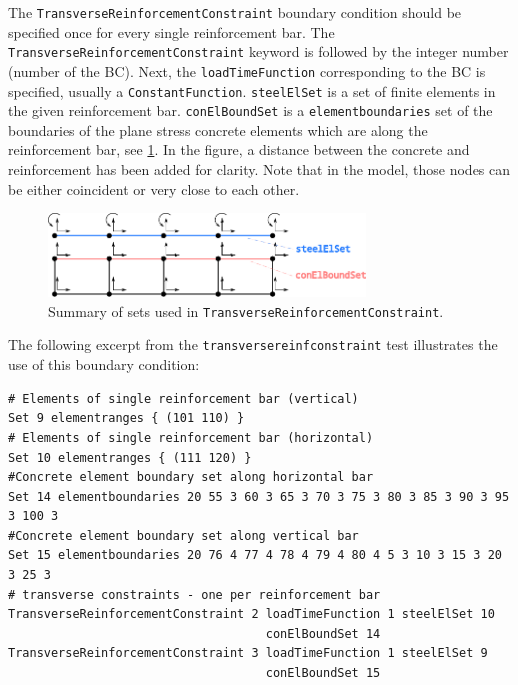 \documentclass[11pt]{article}
\newcommand{\param}[1]{\texttt{#1}}
\begin{document}
The \texttt{TransverseReinforcementConstraint} boundary condition should be specified once for every single reinforcement bar.
\noindent The \param{TransverseReinforcementConstraint} keyword is followed by the integer number (number of the BC). Next, the \param{loadTimeFunction} corresponding to the BC is specified, usually a \param{ConstantFunction}.
\param{steelElSet} is a set of finite elements in the given reinforcement bar. 
\param{conElBoundSet} is a \param{elementboundaries} set of the boundaries of the plane stress concrete elements which are along the reinforcement bar, see \cref{fig:trcsets}. 
In the figure, a distance between the concrete and reinforcement has been added for clarity. Note that in the model, those nodes can be either coincident or very close to each other.

\begin{figure}[H]
    \centering
    \includegraphics[width=0.75\textwidth]{img/trcsets.pdf}
    \caption{Summary of sets used in \param{TransverseReinforcementConstraint}.}
    \label{fig:trcsets}
\end{figure}


\noindent The following excerpt from the \texttt{transversereinfconstraint} test illustrates the use of this boundary condition:

\begin{minipage}{\linewidth}
\begin{lstlisting}[style=oofem,language=oofeminput]
# Elements of single reinforcement bar (vertical)
Set 9 elementranges { (101 110) }
# Elements of single reinforcement bar (horizontal)
Set 10 elementranges { (111 120) }
#Concrete element boundary set along horizontal bar
Set 14 elementboundaries 20 55 3 60 3 65 3 70 3 75 3 80 3 85 3 90 3 95 3 100 3
#Concrete element boundary set along vertical bar
Set 15 elementboundaries 20 76 4 77 4 78 4 79 4 80 4 5 3 10 3 15 3 20 3 25 3
# transverse constraints - one per reinforcement bar
TransverseReinforcementConstraint 2 loadTimeFunction 1 steelElSet 10 
                                    conElBoundSet 14
TransverseReinforcementConstraint 3 loadTimeFunction 1 steelElSet 9 
                                    conElBoundSet 15
\end{lstlisting}
\end{minipage}
\end{document}
